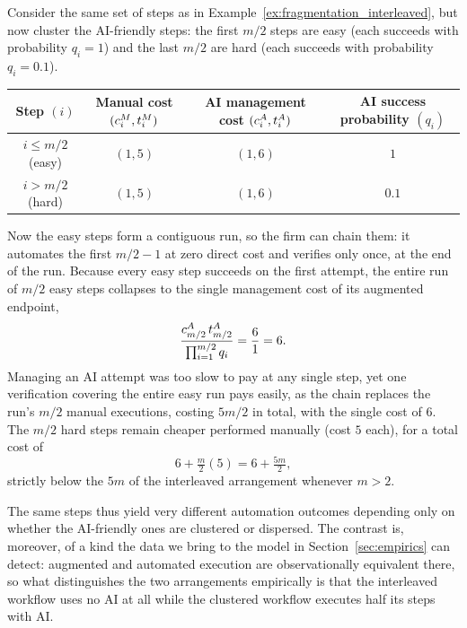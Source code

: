 \begin{example}
\label{ex:fragmentation_clustered}
Consider the same set of steps as in Example~\ref{ex:fragmentation_interleaved}, but now cluster the AI-friendly steps: the first $m/2$ steps are easy (each succeeds with probability $q_i = 1$) and the last $m/2$ are hard (each succeeds with probability $q_i = 0.1$).
\begin{center}
\begin{tabular}{c|ccc}
\toprule
\makecell{Step\\$(i)$} & \makecell{Manual cost\\$(c^{M}_{i}, t^{M}_{i})$} & \makecell{AI management cost\\$(c^{A}_{i}, t^{A}_{i})$} & \makecell{AI success probability\\$(q_i)$} \\
\midrule
$i \le m/2$ (easy) & $(1, 5)$ & $(1, 6)$ & $1$ \\
$i > m/2$ (hard) & $(1, 5)$ & $(1, 6)$ & $0.1$ \\
\bottomrule
\end{tabular}
\end{center}

\vspace{0.25cm}



Now the easy steps form a contiguous run, so the firm can chain them: it automates the first $m/2 - 1$ at zero direct cost and verifies only once, at the end of the run.
Because every easy step succeeds on the first attempt, the entire run of $m/2$ easy steps collapses to the single management cost of its augmented endpoint,
\[
\frac{c^{A}_{m/2}\,t^{A}_{m/2}}{\prod_{i=1}^{m/2} q_i} = \frac{6}{1} = 6.
\]
Managing an AI attempt was too slow to pay at any single step, yet one verification covering the entire easy run pays easily, as the chain replaces the run's $m/2$ manual executions, costing $5m/2$ in total, with the single cost of $6$.
The $m/2$ hard steps remain cheaper performed manually (cost $5$ each), for a total cost of
\[
6 + \tfrac{m}{2}(5) = 6 + \tfrac{5m}{2},
\]
strictly below the $5m$ of the interleaved arrangement whenever $m > 2$.
\end{example}

The same steps thus yield very different automation outcomes depending only on whether the AI-friendly ones are clustered or dispersed.
The contrast is, moreover, of a kind the data we bring to the model in Section~\ref{sec:empirics} can detect: augmented and automated execution are observationally equivalent there, so what distinguishes the two arrangements empirically is that the interleaved workflow uses no AI at all while the clustered workflow executes half its steps with AI.

